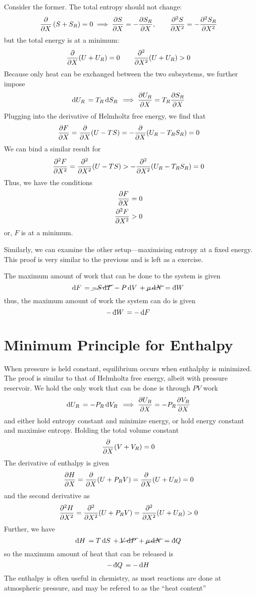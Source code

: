 Consider the former. The total entropy should not change:
\[\frac{\partial }{\partial X}\left(S+S_R\right)=0\implies \frac{\partial S}{\partial X}=-\frac{\partial S_R}{\partial X}, \qquad \frac{\partial ^2S}{\partial X^2}=-\frac{\partial ^2S_R}{\partial X^2}\]
but the total energy is at a minimum:
\[\frac{\partial }{\partial X}(U+U_R)=0\qquad \frac{\partial ^2}{\partial X^2}(U+U_R)>0\]
Because only heat can be exchanged between the two subsystems, we further impose
\[\d{U_R}=T_R\d{S_R}\then \pder{U_R}{X}=T_R\pder{S_R}{X}\]
Plugging into the derivative of Helmholtz free energy, we find that
\[\frac{\partial F}{\partial X}=\frac{\partial }{\partial X}(U-TS)=-\frac{\partial }{\partial X}(U_R-T_RS_R)=0\]
We can bind a similar result for
\[\frac{\partial ^2F}{\partial X^2}=\frac{\partial ^2}{\partial X^2}(U-TS)>-\frac{\partial ^2}{\partial X^2}(U_R-T_RS_R)=0\]
Thus, we have the conditions
\begin{subequations}
	\begin{align*}
		\frac{\partial F}{\partial X}&=0\\
		\frac{\partial ^2F}{\partial X^2}&>0
	\end{align*}
\end{subequations}
or, \(F\) is at a minimum.

Similarly, we can examine the other setup---maximising entropy at a fixed energy. This proof is very similar to the previous and is left as a exercise.

The maximum amount of work that can be done to the system is given
\[\d{F}=\cancel{-S\d{T}}-P\d{V}+\cancel{\mu\d{N}}=\dbar{W}\]
thus, the maximum amount of work the system can do is given
\begin{equation}
	-\dbar{W}=-\d{F}
\end{equation}


\section{Minimum Principle for Enthalpy}
When pressure is held constant, equilibrium occurs when enthalphy is minimized. The proof is similar to that of Helmholtz free energy, albeit with pressure reservoir. We hold the only work that can be done is through \(PV\) work
\[\d{U_R}=-P_R\d{V_R}\then \pder{U_R}{X}=-P_R\pder{V_R}{X}\]
and either hold entropy constant and minimize energy, or hold energy constant and maximise entropy.
Holding the total volume constant
\[\frac{\partial }{\partial X}(V+V_R)=0\]
The derivative of enthalpy is given
\[\frac{\partial H}{\partial X}=\frac{\partial }{\partial X}(U+P_RV)=\frac{\partial }{\partial X}(U+U_R)=0\]
and the second derivative as
\[\frac{\partial ^2H}{\partial X^2}=\frac{\partial ^2}{\partial X^2}(U+P_RV)=\frac{\partial ^2}{\partial X^2}(U+U_R)>0\]
Further, we have
\[\d{H}=T\d{S}+\cancel{V\d{P}}+\cancel{\mu\d{N}}=\dbar{Q}\]
so the maximum amount of heat that can be released is
\begin{equation}
	-\dbar{Q}=-\d{H}
\end{equation}
The enthalpy is often useful in chemistry, as most reactions are done at atmospheric pressure, and may be refered to as the ``heat content''

